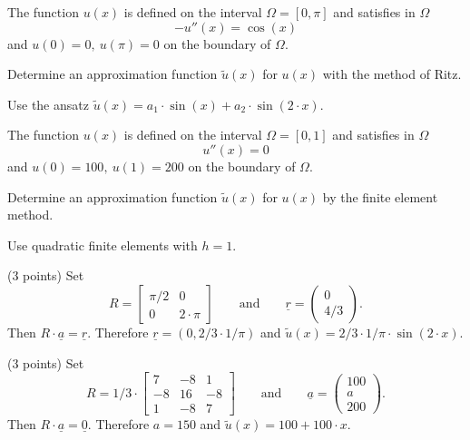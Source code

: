 \begin{teilaufgaben}
\item
The function $u(x)$ is defined on the interval $\Omega = [0, \pi]$ %
and
satisfies in $\Omega$ 
\[
- u''(x) = \cos(x)
\]
and $u(0) = 0, \  u(\pi) = 0$ on the boundary of $\Omega$.  

Determine an approximation function $\tilde u(x)$ for $u(x)$ with
the method of Ritz.

Use the ansatz $\tilde u(x) = a_1 \cdot \sin(x) + a_2 \cdot \sin(2 \cdot x).$

\item
The function $u(x)$ is defined on the interval $\Omega = [0, 1]$ %
and
satisfies in $\Omega$ 
\[
u''(x) = 0
\]
and $u(0) = 100, \  u(1) = 200$ on the boundary of $\Omega$.  

Determine an approximation function $\tilde u(x)$ for $u(x)$ by the
finite element method.

Use quadratic finite elements with $h = 1$.
\end{teilaufgaben}

\begin{loesung}
\begin{teilaufgaben}
\item
(3 points)
Set
\[
R = \left[\begin{array}{cc} \pi/2 & 0  \\ 0 & 2 \cdot \pi \end{array}\right]
\qquad\text{and}\qquad
\underline{r} =  \left(\begin{array}{c} 0 \\ 4/3 \end{array}\right).
\]
Then $R \cdot \underline{a} = \underline{r}$.
Therefore $\underline{r} = (0,2/3 \cdot 1/\pi)$ and
$\tilde u(x) = 2/3 \cdot 1/\pi \cdot \sin(2 \cdot x) $.

\item
(3 points)
Set
\[
R
=
1/3 \cdot
\left[ \begin{array}{rrr}
7 & -8 & 1  \\
-8 & 16 & - 8 \\
1 & -8 & 7
\end{array}\right]
\qquad \mbox{and}\qquad
\underline{a} =  \left(\begin{array}{r} 100 \\ a \\ 200 \end{array}\right).
\]
Then $R \cdot \underline{a} = \underline{0}$.
Therefore $a = 150$ and $\tilde u(x) = 100 + 100 \cdot x$.
\qedhere
\end{teilaufgaben}
\end{loesung}
